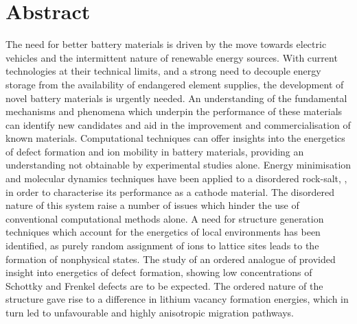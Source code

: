 \chapter*{Abstract}
The need for better battery materials is driven by the move towards electric vehicles and the intermittent nature of renewable energy sources.
With current technologies at their technical limits, and a strong need to decouple energy storage from the availability of endangered element supplies, the development of novel battery materials is urgently needed.
An understanding of the fundamental mechanisms and phenomena which underpin the performance of these materials can identify new candidates and aid in the improvement and commercialisation of known materials.
Computational techniques can offer insights into the energetics of defect formation and ion mobility in battery materials, providing an understanding not obtainable by experimental studies alone.
Energy minimisation and molecular dynamics techniques have been applied to a disordered rock-salt, , in order to characterise its performance as a cathode material.
The disordered nature of this system raise a number of issues which hinder the use of conventional computational methods alone.
A need for structure generation techniques which account for the energetics of local environments has been identified, as purely random assignment of ions to lattice sites leads to the formation of nonphysical states.
The study of an ordered analogue of  provided insight into energetics of defect formation, showing low concentrations of Schottky and Frenkel defects are to be expected.
The ordered nature of the structure gave rise to a difference in lithium vacancy formation energies, which in turn led to unfavourable and highly anisotropic migration pathways.
